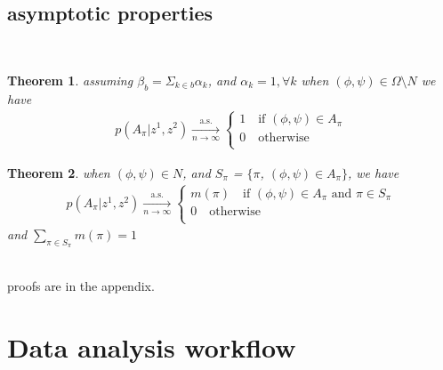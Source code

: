 \documentclass[11pt]{amsart}
\newtheorem{theorem}{Theorem}
\begin{document}
\subsection{asymptotic properties}\hfill\\
\begin{theorem} assuming $\beta_b = \Sigma_{k\in b} \alpha_k$, and $\alpha_k = 1, \forall k$ when $(\phi, \psi)\in \Omega\setminus N $ we have 
\begin{eqnarray*}
    p(A_{\pi} | z^1, z^2) \xrightarrow[n\rightarrow\infty]{\text{a.s.}}\left\{
                \begin{array}{ll}
                 1 \quad \text{if }(\phi,\psi) \in A_\pi\\
                 0 \quad \text{otherwise}\\             
                \end{array}
              \right.
\end{eqnarray*}
\end{theorem}
\begin{theorem} when $(\phi, \psi)\in N$,  and  $S_\pi$ = $\{\pi$,  $(\phi, \psi) \in A_\pi\}$, we have 
\begin{eqnarray*}
    p(A_{\pi} | z^1, z^2) \xrightarrow[n\rightarrow\infty]{\text{a.s.}}\left\{
                \begin{array}{ll}
                 m(\pi) \quad \text{if }(\phi,\psi) \in A_\pi \text{ and } \pi \in S_\pi\\
                 0 \quad \text{otherwise}\\             
                \end{array}
              \right.
\end{eqnarray*}
and $\sum_{\pi\in S_\pi} m(\pi) = 1$\\
\end{theorem}\hfill\\
proofs are in the appendix. 


\section{Data analysis workflow} 
\end{document}
